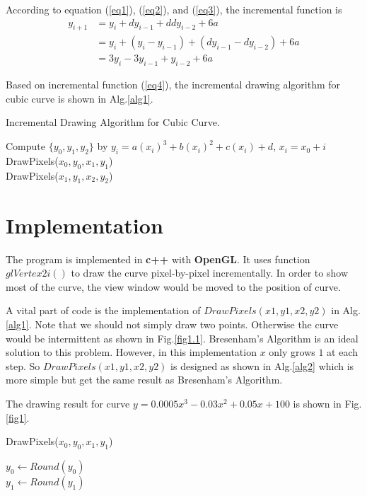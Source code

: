 \documentclass[12pt,a4paper]{article}
\theoremstyle{definition}
\numberwithin{equation}{section}
\numberwithin{figure}{section}
\begin{document}
According to equation (\ref{eq1}), (\ref{eq2}), and  (\ref{eq3}), the incremental function is
\begin{align}
y_{i+1} &= y_i+dy_{i-1}+ddy_{i-2}+6a\nonumber\\
&=y_i+(y_i-y_{i-1})+(dy_{i-1}-dy_{i-2})+6a\nonumber\\
&=3y_i-3y_{i-1}+y_{i-2}+6a\label{eq4}
\end{align}

Based on incremental function (\ref{eq4}), the incremental drawing algorithm for cubic curve is shown in Alg.\ref{alg1}.

\begin{algorithm}[h]
	\caption{Incremental Drawing Algorithm for Cubic Curve.}
	\label{alg1}
	Compute $\{y_0, y_1, y_2\}$ by $y_i=a(x_i)^3+b(x_i)^2+c(x_i)+d$, $x_i=x_0+i$\\
	DrawPixels($x_0,y_0,x_1,y_1$)\\
	DrawPixels($x_1,y_1,x_2,y_2$)\\
\end{algorithm}

\section{Implementation}
The program is implemented in \textbf{c++} with \textbf{OpenGL}. It uses function $glVertex2i()$ to draw the curve pixel-by-pixel incrementally. In order to show most of the curve, the view window would be moved to the position of curve.

A vital part of code is the implementation of $DrawPixels(x1, y1, x2, y2)$ in Alg.\ref{alg1}. Note that we should not simply draw two points. Otherwise the curve would be intermittent as shown in Fig.\ref{fig1.1}. Bresenham's Algorithm is an ideal solution to this problem. However, in this implementation $x$ only grows $1$ at each step. So $DrawPixels(x1, y1, x2, y2)$ is designed as shown in Alg.\ref{alg2} which is more simple but get the same result as Bresenham's Algorithm.

The drawing result for curve $y= 0.0005x^3-0.03x^2+0.05x+100$ is shown in Fig.\ref{fig1}.

\begin{algorithm}[h]
	\caption{DrawPixels($x_0,y_0,x_1,y_1$)}
	\label{alg2}
	$y_0\leftarrow Round(y_0)$\\
	$y_1\leftarrow Round(y_1)$\\
\end{algorithm}
\end{document}
